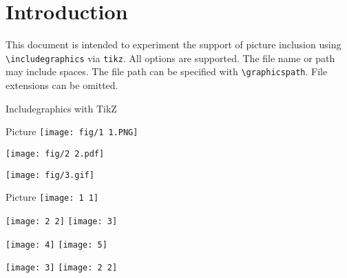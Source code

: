 \documentclass{article}
\begin{document}
\section*{Introduction}

This document is intended to experiment the support of picture inclusion using 
\verb|\includegraphics| via \texttt{tikz}. All options are supported. The file 
name or path may include spaces. The file path can be specified with 
\verb|\graphicspath|. File extensions can be omitted.

\begin{quiz}{Includegraphics with TikZ}

\begin{multi}{Picture}
\texttt{[image: fig/1 1.PNG]}
\item* \texttt{[image: fig/2 2.pdf]}
\item \texttt{[image: fig/3.gif]}
\end{multi}

\graphicspath{{./fig/}}
\begin{matching}[dd]{Picture}
\texttt{[image: 1 1]}
\item \texttt{[image: 2 2]} \answer \texttt{[image: 3]}
\item \texttt{[image: 4]} \answer \texttt{[image: 5]}
\item \texttt{[image: 3]} \answer 
\texttt{[image: 2 2]}
\end{matching}

\end{quiz}
\end{document}
